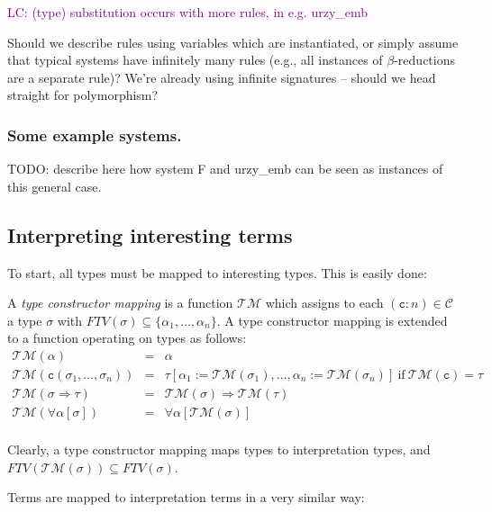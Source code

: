 \documentclass[runningheads,a4paper]{llncs}
\newcommand{\TypeConstructors}{\mathcal{C}}
\newcommand{\Typemap}{\mathcal{T\!M}}
\newcommand{\quant}[2]{\forall #1[#2]}
\newcommand{\arrtype}{\Rightarrow}
\newcommand{\FTV}{\mathit{FTV}}
\newcommand{\con}{\mathtt{c}}
\newcommand{\LC}[1]{\textcolor{purple}{LC: #1}}
\begin{document}
\LC{(type) substitution occurs with more rules, in e.g. urzy\_emb}

Should we describe rules using variables which are instantiated, or
simply assume that typical systems have infinitely many rules (e.g.,
all instances of $\beta$-reductions are a separate rule)? We're
already using infinite signatures -- should we head straight for
polymorphism?

\subsubsection{Some example systems.}

TODO: describe here how system F and urzy\_emb can be seen as instances
of this general case.

\subsection{Interpreting interesting terms}

To start, all types must be mapped to interesting types.  This is
easily done:

\begin{definition}
A \emph{type constructor mapping} is a function $\Typemap$ which assigns
to each $(\con:n) \in \TypeConstructors$ a type $\sigma$ with
$\FTV(\sigma) \subseteq \{ \alpha_1,\dots,\alpha_n \}$.  A type
constructor mapping is extended to a function operating on types as
follows:
\[
\begin{array}{rcl}
\Typemap(\alpha) & = & \alpha \\
\Typemap(\con(\sigma_1,\dots,\sigma_n)) & = &
  \tau[\alpha_1:=\Typemap(\sigma_1),\dots,\alpha_n:=\Typemap(\sigma_n)]\ 
  \text{if}\ \Typemap(\con) = \tau \\
\Typemap(\sigma \arrtype \tau) & = & \Typemap(\sigma) \arrtype
  \Typemap(\tau) \\
\Typemap(\quant{\alpha}{\sigma}) & = & \quant{\alpha}{\Typemap(\sigma)} \\
\end{array}
\]
\end{definition}

Clearly, a type constructor mapping maps types to interpretation types,
and $\FTV(\Typemap(\sigma)) \subseteq \FTV(\sigma)$.

Terms are mapped to interpretation terms in a very similar way:
\end{document}
